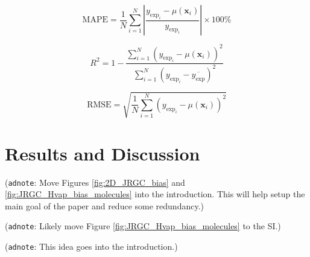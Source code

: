 \documentclass[journal=jacsat,manuscript=article, ]{achemso}
\newcommand{\adnote}[1]{{\color{OliveGreen} (\texttt{adnote}: #1)}}
\begin{document}
\begin{equation}
    \text{MAPE} = \frac{1}{N} \sum_{i=1}^{N} \left| \frac{y_{\text{exp}_i} - \mu(\mathbf{x}_i)}{y_{\text{exp}_i}} \right| \times 100\%
    \label{eq:MAPD}
\end{equation}

\begin{equation}
    R^2 = 1 - \frac{\sum_{i=1}^{N} \left( y_{\text{exp}_i} - \mu(\mathbf{x}_i) \right)^2}{\sum_{i=1}^{N} \left( y_{\text{exp}_i} - \overline{y_{\text{exp}}} \right)^2}
    \label{eq:COD}
\end{equation}

\begin{equation}
    \text{RMSE} = \sqrt{\frac{1}{N} \sum_{i=1}^{N} \left( y_{\text{exp}_i} - \mu(\mathbf{x}_i) \right)^2}
    \label{eq:RMSE}
\end{equation}

\section{Results and Discussion}


\adnote{Move Figures \ref{fig:2D_JRGC_bias} and \ref{fig:JRGC_Hvap_bias_molecules} into the introduction. This will help setup the main goal of the paper and reduce some redundancy.}




\adnote{Likely move Figure \ref{fig:JRGC_Hvap_bias_molecules} to the SI.}





\adnote{This idea goes into the introduction.} 
\end{document}

